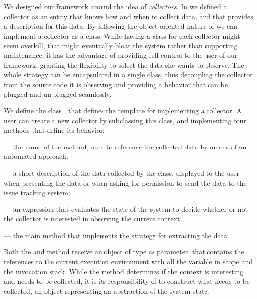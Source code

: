 We designed our framework around the idea of \emph{collectors}.
In  we defined a collector as an entity that knows how and when to collect data, and that provides a description for this data.
By following the object-oriented nature of \pha we can implement a collector as a class.
While having a class for each collector might seem overkill, that might eventually bloat the system rather than supporting maintenance, it has the advantage of providing full control to the user of our framework, granting the flexibility to select the data she wants to observe.
The whole strategy can be encapsulated in a single class, thus decoupling the collector from the source code it is observing and providing a behavior that can be plugged and un-plugged seamlessly.

We define the class , that defines the template for implementing a collector.
A user can create a new collector by subclassing this class, and implementing four methods that define its behavior:

\begin{description}

\item {} --- the name of the method, used to reference the collected data by means of an automated approach;

\item {} --- a short description of the data collected by the class, displayed to the user when presenting the data or when asking for permission to send the data to the issue tracking system;

\item {} --- an expression that evaluates the state of the system to decide whether or not the collector is interested in observing the current context;

\item {} --- the main method that implements the strategy for extracting the data.

\end{description}

Both the  and  method receive an object of type  as parameter, that contains the references to the current execution environment with all the variable in scope and the invocation stack.
While the  method determines if the context is interesting and needs to be collected, it is its responsibility of  to construct what needs to be collected, \eg an object representing an abstraction of the system state.

